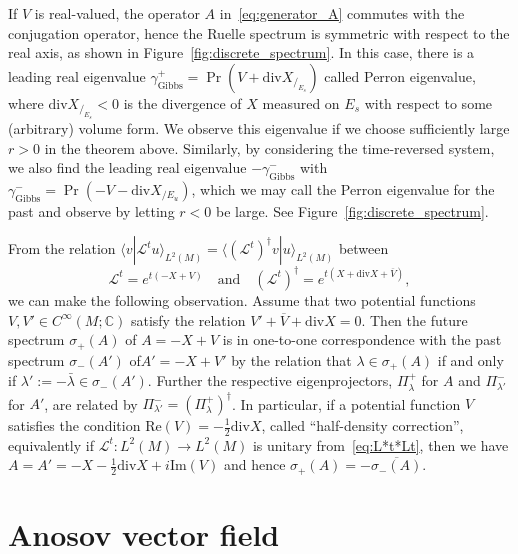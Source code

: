 \documentclass[AHL,Unicode,longabstracts,published]{cedram}
\newcommand{\clL}{\mathcal{L}}
\newcommand{\Ree}{\mathrm{Re}}
\newcommand{\Imm}{\mathrm{Im}}
\newcommand{\divv}{\mathrm{div}}
\newcommand{\Gibbs}{\mathrm{Gibbs}}
\newcommand{\bbC}{\mathbb{C}}
\newcommand{\Imm}{\mathrm{Im}}
\newcommand{\Ree}{\mathrm{Re}}
\begin{document}
\begin{rema}
If $V$ is real-valued, the operator $A$ in~\eqref{eq:generator_A} commutes with the conjugation operator, hence the Ruelle spectrum is symmetric with respect to the real axis, as shown in Figure~\ref{fig:discrete_spectrum}. In this case, there is a leading real eigenvalue $\gamma_{\Gibbs}^{+}=\Pr(V+\divv X_{/_{E_{s}}})$ called Perron eigenvalue, where $\divv X_{/_{E_{s}}}<0$ is the divergence of $X$ measured on $E_{s}$ with respect to some (arbitrary) volume form. We observe this eigenvalue if we choose sufficiently large $r>0$ in the theorem above. Similarly, by considering the time-reversed system, we also find the leading real eigenvalue $-\gamma_{\Gibbs}^{-}$ with $\gamma_{\Gibbs}^{-}=\Pr(-V-\divv X_{/E_{u}})$, which we may call the Perron eigenvalue for the past and observe by letting $r<0$ be large. See Figure~\ref{fig:discrete_spectrum}.
\end{rema}


\begin{rema}
From the relation $\langle v|\clL^{t}u\rangle_{L^{2}(M)}=\langle(\clL^{t})^{\dagger}v|u\rangle_{L^{2}(M)}$ between
\[
\clL^{t}=e^{t\left(-X+V\right)}\quad\text{and}\quad\left(\clL^{t}\right)^{\dagger}=e^{t\left(X+\divv X+\overline{V}\right)},
\]
we can make the following observation. Assume that two potential functions $V,V'\in C^{\infty}(M;\bbC)$ satisfy the relation $V'+\overline{V}+\divv X=0$. Then the future spectrum $\sigma_{+}(A)$ of $A=-X+V$ is in one-to-one correspondence with the past spectrum $\sigma_{-}(A')$ of\linebreak $A'=-X+V'$ by the relation that $\lambda\in\sigma_{+}(A)$ if and only if $\lambda':=-\bar{\lambda}\in\sigma_{-}(A')$. Further the respective eigenprojectors, $\Pi_{\lambda}^{+}$ for $A$ and $\Pi_{\lambda'}^{-}$ for $A'$, are related by $\Pi_{\lambda'}^{-}=(\Pi_{\lambda}^{+})^{\dagger}$. In particular, if a potential function $V$ satisfies the condition $\Ree(V)=-\frac{1}{2}\divv X$, called ``half-density correction'', equivalently if $\clL^{t}:L^{2}(M)\rightarrow L^{2}(M)$ is unitary from~\eqref{eq:L*t*Lt}, then we have $A=A'=-X-\frac{1}{2}\divv X+i\Imm(V)$ and hence $\sigma_{+}(A)=-\overline{\sigma_{-}(A)}$.
\end{rema}


\break
\section{Anosov vector field}\label{subsec:Anosov_def}
\end{document}
